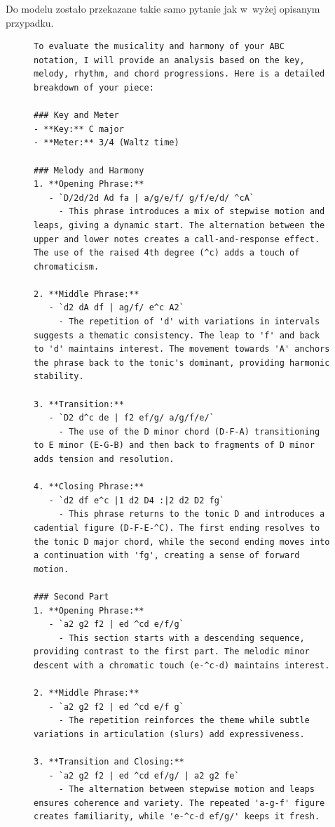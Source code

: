 \documentclass[data-science]{agh-wi} %
\begin{document}
Do modelu zostało przekazane takie samo pytanie jak w~wyżej opisanym przypadku.
\begin{figure}[ht!]
    \begin{verbatim}
To evaluate the musicality and harmony of your ABC notation, I will provide an analysis based on the key, melody, rhythm, and chord progressions. Here is a detailed breakdown of your piece:

### Key and Meter
- **Key:** C major
- **Meter:** 3/4 (Waltz time)

### Melody and Harmony
1. **Opening Phrase:**
   - `D/2d/2d Ad fa | a/g/e/f/ g/f/e/d/ ^cA`
     - This phrase introduces a mix of stepwise motion and leaps, giving a dynamic start. The alternation between the upper and lower notes creates a call-and-response effect. The use of the raised 4th degree (^c) adds a touch of chromaticism.

2. **Middle Phrase:**
   - `d2 dA df | ag/f/ e^c A2`
     - The repetition of 'd' with variations in intervals suggests a thematic consistency. The leap to 'f' and back to 'd' maintains interest. The movement towards 'A' anchors the phrase back to the tonic's dominant, providing harmonic stability.

3. **Transition:**
   - `D2 d^c de | f2 ef/g/ a/g/f/e/`
     - The use of the D minor chord (D-F-A) transitioning to E minor (E-G-B) and then back to fragments of D minor adds tension and resolution.

4. **Closing Phrase:**
   - `d2 df e^c |1 d2 D4 :|2 d2 D2 fg`
     - This phrase returns to the tonic D and introduces a cadential figure (D-F-E-^C). The first ending resolves to the tonic D major chord, while the second ending moves into a continuation with 'fg', creating a sense of forward motion.

### Second Part
1. **Opening Phrase:**
   - `a2 g2 f2 | ed ^cd e/f/g`
     - This section starts with a descending sequence, providing contrast to the first part. The melodic minor descent with a chromatic touch (e-^c-d) maintains interest.

2. **Middle Phrase:**
   - `a2 g2 f2 | ed ^cd e/f g`
     - The repetition reinforces the theme while subtle variations in articulation (slurs) add expressiveness.

3. **Transition and Closing:**
   - `a2 g2 f2 | ed ^cd ef/g/ | a2 g2 fe`
     - The alternation between stepwise motion and leaps ensures coherence and variety. The repeated 'a-g-f' figure creates familiarity, while 'e-^c-d ef/g/' keeps it fresh.


\end{verbatim}
\end{figure}
\end{document}

